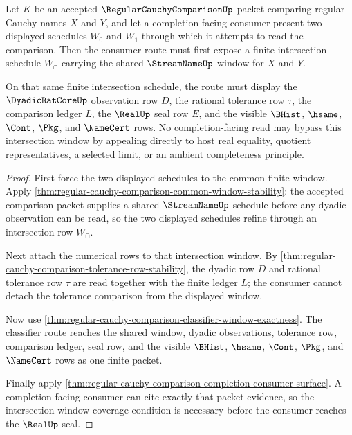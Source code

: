 \begin{theorem}
\label{thm:regular-cauchy-comparison-window-intersection-coverage}
Let $K$ be an accepted $\RegularCauchyComparisonUp$ packet comparing regular Cauchy names $X$ and $Y$, and let a completion-facing consumer present two displayed schedules $W_0$ and $W_1$ through which it attempts to read the comparison. Then the consumer route must first expose a finite intersection schedule $W_{\cap}$ carrying the shared $\StreamNameUp$ window for $X$ and $Y$.

On that same finite intersection schedule, the route must display the $\DyadicRatCoreUp$ observation row $D$, the rational tolerance row $\tau$, the comparison ledger $L$, the $\RealUp$ seal row $E$, and the visible $\BHist$, $\hsame$, $\Cont$, $\Pkg$, and $\NameCert$ rows. No completion-facing read may bypass this intersection window by appealing directly to host real equality, quotient representatives, a selected limit, or an ambient completeness principle.
\end{theorem}
\begin{proof}
First force the two displayed schedules to the common finite window. Apply \autoref{thm:regular-cauchy-comparison-common-window-stability}: the accepted comparison packet supplies a shared $\StreamNameUp$ schedule before any dyadic observation can be read, so the two displayed schedules refine through an intersection row $W_{\cap}$.

Next attach the numerical rows to that intersection window. By \autoref{thm:regular-cauchy-comparison-tolerance-row-stability}, the dyadic row $D$ and rational tolerance row $\tau$ are read together with the finite ledger $L$; the consumer cannot detach the tolerance comparison from the displayed window.

Now use \autoref{thm:regular-cauchy-comparison-classifier-window-exactness}. The classifier route reaches the shared window, dyadic observations, tolerance row, comparison ledger, seal row, and the visible $\BHist$, $\hsame$, $\Cont$, $\Pkg$, and $\NameCert$ rows as one finite packet.

Finally apply \autoref{thm:regular-cauchy-comparison-completion-consumer-surface}. A completion-facing consumer can cite exactly that packet evidence, so the intersection-window coverage condition is necessary before the consumer reaches the $\RealUp$ seal.
\end{proof}

